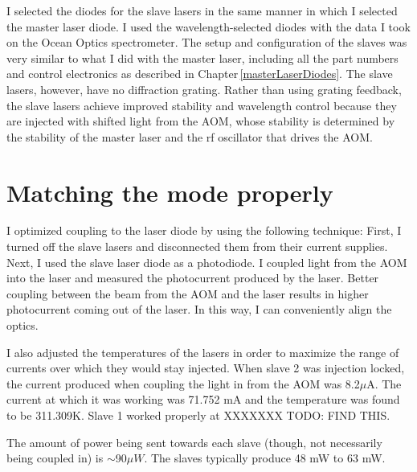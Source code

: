 I selected the diodes for the slave lasers in the same manner in which I selected the master laser diode. I used the wavelength-selected diodes with the data I took on the Ocean Optics spectrometer. The setup and configuration of the slaves was very similar to what I did with the master laser, including all the part numbers and control electronics as described in Chapter\,\ref{masterLaserDiodes}. The slave lasers, however, have no diffraction grating. Rather than using grating feedback, the slave lasers achieve improved stability and wavelength control because they are injected with shifted light from the AOM, whose stability is determined by the stability of the master laser and the rf oscillator that drives the AOM. 




\section{Matching the mode properly}
I optimized coupling to the laser diode by using the following technique: First, I turned off the slave lasers and disconnected them from their current supplies. Next, I used the slave laser diode as a photodiode. I coupled light from the AOM into the laser and measured the photocurrent produced by the laser. Better coupling between the beam from the AOM and the laser results in higher photocurrent coming out of the laser. In this way, I can conveniently align the optics. 

I also adjusted the temperatures of the lasers in order to maximize the range of currents over which they would stay injected. 
When slave 2 was injection locked, the current produced when coupling the light in from the AOM was 8.2$\mu$A. The current at which it was working was 71.752 mA %
and the temperature was found to be 311.309K. %
Slave 1 worked properly at XXXXXXX TODO: FIND THIS.

The amount of power being sent towards each slave (though, not necessarily being coupled in) is $\sim$90$\mu W$. The slaves typically produce 48 mW to 63 mW.
